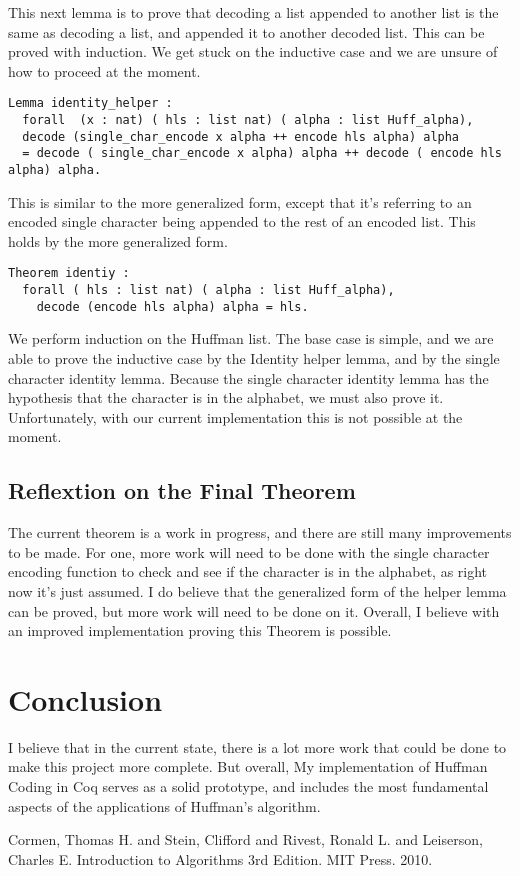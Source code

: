\documentclass{llncs}
\begin{document}
This next lemma is to prove that decoding a list appended to another list is the same as decoding a list, and appended it to another decoded list. This can be proved with induction.  We get stuck on the inductive case and we are unsure of how to proceed at the moment.

\begin{lstlisting}
Lemma identity_helper :
  forall  (x : nat) ( hls : list nat) ( alpha : list Huff_alpha),
  decode (single_char_encode x alpha ++ encode hls alpha) alpha
  = decode ( single_char_encode x alpha) alpha ++ decode ( encode hls alpha) alpha.
\end{lstlisting}

This is similar to the more generalized form, except that it’s referring to an encoded single character being appended to the rest of an encoded list. This holds by the more generalized form.

\begin{lstlisting}
Theorem identiy :
  forall ( hls : list nat) ( alpha : list Huff_alpha),
    decode (encode hls alpha) alpha = hls.
\end{lstlisting}

We perform induction on the Huffman list.  The base case is simple, and we are able to prove the inductive case by the Identity helper lemma, and by the single character identity lemma. Because the single character identity lemma has the hypothesis that the character is in the alphabet, we must also prove it.  Unfortunately, with our current implementation this is not possible at the moment. 

\subsection{Reflextion on the Final Theorem}

The current theorem is a work in progress, and there are still many improvements to be made. For one, more work will need to be done with the single character encoding function to check and see if the character is in the alphabet, as right now it’s just assumed. I do believe that the generalized form of the helper lemma can be proved, but more work will need to be done on it. Overall, I believe with an improved implementation proving this Theorem is possible.

\section{Conclusion}
 I believe that in the current state, there is a lot more work that could be done to make this project more complete. But overall, My implementation of Huffman Coding in Coq serves as a solid prototype, and includes the most fundamental aspects of the applications of Huffman’s algorithm. 




Cormen, Thomas H. and Stein, Clifford and Rivest, Ronald L. and Leiserson, Charles E. Introduction to Algorithms 3rd Edition. MIT Press. 2010.
\end{document}
